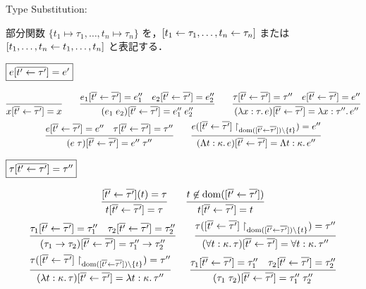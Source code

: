 Type Substitution:

部分関数 $\{t_1 \mapsto \tau_1, \ldots, t_n \mapsto \tau_n\}$ を，$[t_1 \gets \tau_1, \ldots, t_n \gets \tau_n]$ または $[t_1, \ldots, t_n \gets t_1, \ldots, t_n]$ と表記する．

$\fbox{$e[\overline{t' \gets \tau'}] = e'$}$

\begin{gather*}
  \infer{x[\overline{t'} \assign \overline{\tau'}] = x}{}
  \hspace{2em}
  \infer{(e_1\; e_2)[\overline{t'} \assign \overline{\tau'}] = e''_1\; e''_2}{
    e_1[\overline{t'} \assign \overline{\tau'}] = e''_1
    &
    e_2[\overline{t'} \assign \overline{\tau'}] = e''_2
  }
  \hspace{2em}
  \infer{(\lambda x: \tau\ldotp e)[\overline{t'} \assign \overline{\tau'}] = \lambda x: \tau''\ldotp e''}{
    \tau[\overline{t'} \assign \overline{\tau'}] = \tau''
    &
    e[\overline{t'} \assign \overline{\tau'}] = e''
  }
  \\
  \infer{(e\; \tau)[\overline{t'} \assign \overline{\tau'}] = e''\; \tau''}{
    e[\overline{t'} \assign \overline{\tau'}] = e''
    &
    \tau[\overline{t'} \assign \overline{\tau'}] = \tau''
  }
  \hspace{2em}
  \infer{(\Lambda t: \kappa\ldotp e)[\overline{t'} \assign \overline{\tau'}] = \Lambda t: \kappa\ldotp e''}{
    e([\overline{t'} \assign \overline{\tau'}]\restrict_{\dom([\overline{t'} \assign \overline{\tau'}]) \rcomplement \{t\}}) = e''
  }
\end{gather*}

$\fbox{$\tau[\overline{t' \gets \tau'}] = \tau''$}$

\begin{gather*}
  \infer{t[\overline{t'} \assign \overline{\tau'}] = \tau}{
    [\overline{t'} \assign \overline{\tau'}](t) = \tau
  }
  \hspace{2em}
  \infer{t[\overline{t'} \assign \overline{\tau'}] = t}{
    t \not\in \dom([\overline{t'} \assign \overline{\tau'}])
  }
  \\
  \infer{(\tau_1 \to \tau_2)[\overline{t'} \assign \overline{\tau'}] = \tau''_1 \to \tau''_2}{
    \tau_1[\overline{t'} \assign \overline{\tau'}] = \tau''_1
    &
    \tau_2[\overline{t'} \assign \overline{\tau'}] = \tau''_2
  }
  \hspace{2em}
  \infer{(\forall t: \kappa\ldotp \tau)[\overline{t'} \assign \overline{\tau'}] = \forall t: \kappa\ldotp \tau''}{
    \tau([\overline{t'} \assign \overline{\tau'}]\restrict_{\dom([\overline{t'} \assign \overline{\tau'}]) \rcomplement \{t\}}) = \tau''
  }
  \\
  \infer{(\lambda t: \kappa\ldotp \tau)[\overline{t'} \assign \overline{\tau'}] = \lambda t: \kappa\ldotp \tau''}{
    \tau([\overline{t'} \assign \overline{\tau'}]\restrict_{\dom([\overline{t'} \assign \overline{\tau'}]) \rcomplement \{t\}}) = \tau''
  }
  \hspace{2em}
  \infer{(\tau_1\; \tau_2)[\overline{t'} \assign \overline{\tau'}] = \tau''_1\; \tau''_2}{
    \tau_1[\overline{t'} \assign \overline{\tau'}] = \tau''_1
    &
    \tau_2[\overline{t'} \assign \overline{\tau'}] = \tau''_2
  }
\end{gather*}


